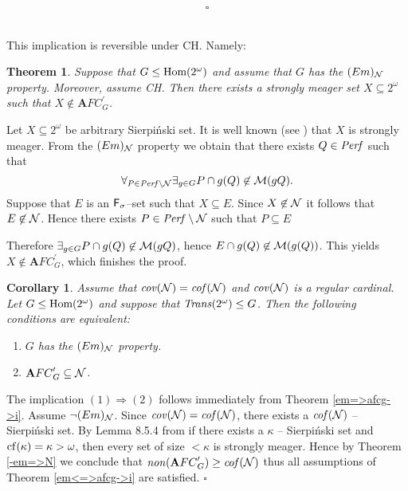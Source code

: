 \documentclass[b5cutpaper, twoside, 11pt, leqno]{moravica}
\newcommand{\afcp}{{\mathbf AFC}^\prime}
\newcommand\afcg{\afcp_{G}}
\newcommand\trans{{\it Trans}(\ca)}
\newcommand\ooo{\underline{O}}
\newcommand{\seq}{\subseteq}
\newcommand{\ca}{2^{\omega}}
\newcommand{\mgr}{{\cal M}}
\newcommand{\neglig}{{\cal N}}
\newcommand{\oo}{\omega}
\newcommand{\perf}{{\it Perf}}
\newcommand{\fsigma}{{\sf F}_{\sigma}}
\newcommand{\cof}{{\it cof}}
\newcommand{\cov}{{\it cov}}
\newcommand{\non}{{\it non}}
\newcommand\Hom{{\rm Hom(\ca)}}
\newcommand{\cf}{{\rm cf}}
\newtheorem{theorem}{Theorem}[section]
\newtheorem{corollary}{Corollary}[section]
\theoremstyle{definition}
\begin{document}

$$\square$$

 \\

This implication is reversible
under CH. Namely:

\begin{theorem}
Suppose that $G \leq \Hom$ and assume that $G$ has the $(Em)_{\neglig}$
property. Moreover, assume CH. Then there exists a strongly
meager set $X\seq\ca$ such that $X \not\in \afcg$.
\end{theorem}


\proof

  Let $X\seq\ca$ be arbitrary Sierpi\'nski set.
It is well known (see \cite{P}) that $X$ is
strongly meager.
  From the $(Em)_{\neglig}$ property we obtain that
there exists $Q \in \perf$ such that
  \[
    \forall_{P \in \perf \setminus \neglig}
    \exists_{g \in G} P \cap g(Q) \not\in \mgr(gQ).
  \]
Suppose that $E$ is an $\fsigma$--set such that $X \seq E$.
Since $X \not \in \neglig$ it follows that $E \not \in \neglig$.
  Hence there exists $P \in \perf \setminus \neglig $ such that
$P \seq E$

Therefore $\exists_{g \in G} P \cap g(Q) \not\in \mgr(gQ)$,
hence $E \cap g(Q) \not\in \mgr(g(Q))$.
  This yields $X \not\in \afcg$, which finishes the proof.

\begin{corollary}
\label{corollary_1}
  Assume that $\cov(\neglig) = \cof(\neglig)$ and
$\cov(\neglig)$ is a regular cardinal.
  Let $G \leq \Hom$ and suppose that $\trans \leq G$.
Then the following conditions are equivalent:

  \begin{enumerate}
  \item
    $G$ has the $(Em)_{\neglig}$ property.

  \item
    $\afcg \seq \neglig$.

  \end{enumerate}
\end{corollary}

\proof
  The implication $(1) \Rightarrow (2)$ follows immediately
from Theorem \ref{em=>afcg->i}.
  Assume $\neg (Em)_{\neglig}$. Since $\cov(\neglig) = \cof(\neglig)$,
there exists a $\cof(\neglig)$ -- Sierpi\'nski set.
  By Lemma 8.5.4 from \cite{BJ}
if there exists a $\kappa$ -- Sierpi\'nski set
and $\cf(\kappa) = \kappa > \oo$,
then every set of size $< \kappa$ is strongly meager.
  Hence by Theorem \ref{-em=>N} we conclude that
$\non(\afcg) \geq \cof(\neglig)$
thus all assumptions of Theorem \ref{em<=>afcg->i} are satisfied.
  $\square$
\end{document}
